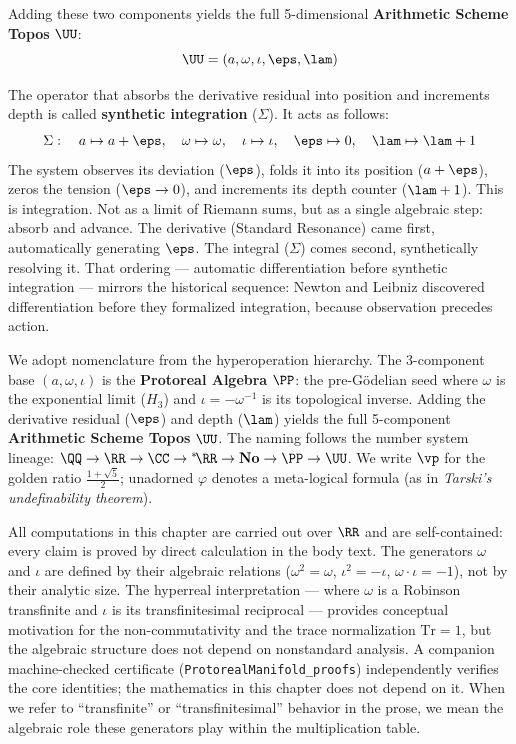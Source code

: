 Adding these two components yields the full 5-dimensional \textbf{Arithmetic Scheme Topos} $\UU$:
$$\UU = (a, \omega, \iota, \eps, \lam)$$

The operator that absorbs the derivative residual into position and increments depth is called \textbf{synthetic integration} ($\Sigma$). It acts as follows:
$$\Sigma: \quad a \mapsto a + \eps, \quad \omega \mapsto \omega, \quad \iota \mapsto \iota, \quad \eps \mapsto 0, \quad \lam \mapsto \lam + 1$$
The system observes its deviation ($\eps$), folds it into its position ($a + \eps$), zeros the tension ($\eps \to 0$), and increments its depth counter ($\lam + 1$). This is integration. Not as a limit of Riemann sums, but as a single algebraic step: absorb and advance. The derivative (Standard Resonance) came first, automatically generating $\eps$. The integral ($\Sigma$) comes second, synthetically resolving it. That ordering --- automatic differentiation before synthetic integration --- mirrors the historical sequence: Newton and Leibniz discovered differentiation before they formalized integration, because observation precedes action.

\begin{remark}\label{rem:hyper-tower}
We adopt nomenclature from the hyperoperation hierarchy. The 3-component base $(a, \omega, \iota)$ is the \textbf{Protoreal Algebra} $\PP$: the pre-G\"odelian seed where $\omega$ is the exponential limit ($H_3$) and $\iota = -\omega^{-1}$ is its topological inverse. Adding the derivative residual ($\eps$) and depth ($\lam$) yields the full 5-component \textbf{Arithmetic Scheme Topos} $\UU$. The naming follows the number system lineage: $\QQ \to \RR \to \CC \to {}^*\!\RR \to \mathbf{No} \to \PP \to \UU$. We write $\vp$ for the golden ratio $\tfrac{1+\sqrt{5}}{2}$; unadorned $\varphi$ denotes a meta-logical formula (as in \emph{Tarski's undefinability theorem}).
\end{remark}

\begin{remark}\label{rem:convention}
All computations in this chapter are carried out over $\RR$ and are
self-contained: every claim is proved by direct calculation in the body
text. The generators $\omega$ and $\iota$ are defined by their algebraic
relations ($\omega^2 = \omega$, $\iota^2 = -\iota$,
$\omega \cdot \iota = -1$), not by their analytic size. The hyperreal
interpretation --- where $\omega$ is a Robinson transfinite and $\iota$
is its transfinitesimal reciprocal --- provides conceptual motivation
for the non-commutativity and the trace normalization $\mathrm{Tr} = 1$,
but the algebraic structure does not depend on nonstandard analysis.
A companion machine-checked certificate
(\texttt{ProtorealManifold\_proofs}) independently verifies the
core identities; the mathematics in this chapter does not depend on it.
When we refer to ``transfinite'' or ``transfinitesimal'' behavior in the
prose, we mean the algebraic role these generators play within the
multiplication table.
\end{remark}


